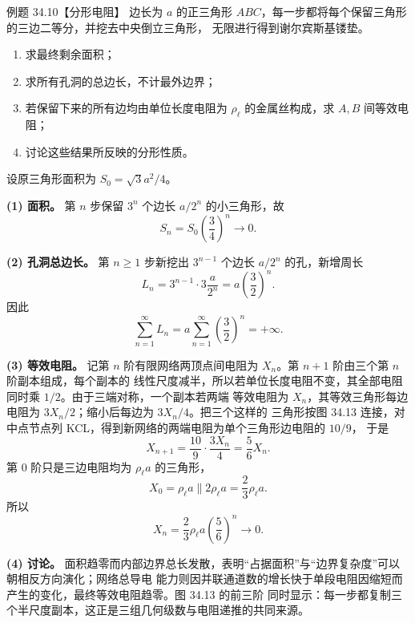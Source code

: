 \Needspace{0.48\textheight}
\begin{origexamplebox}{例题 34.10【分形电阻】}
边长为 $a$ 的正三角形 $ABC$，每一步都将每个保留三角形的三边二等分，并挖去中央倒立三角形，
无限进行得到谢尔宾斯基镂垫。
\begin{enumerate}[label=(\arabic*),leftmargin=2.2em]
  \item 求最终剩余面积；
  \item 求所有孔洞的总边长，不计最外边界；
  \item 若保留下来的所有边均由单位长度电阻为 $\rho_\ell$ 的金属丝构成，求 $A,B$ 间等效电阻；
  \item 讨论这些结果所反映的分形性质。
\end{enumerate}
\end{origexamplebox}

\begin{xesolution}
设原三角形面积为 $S_0=\sqrt3a^2/4$。

\textbf{(1) 面积。}
第 $n$ 步保留 $3^n$ 个边长 $a/2^n$ 的小三角形，故
\begin{equation}
  S_n=S_0\left(\frac34\right)^n
  \longrightarrow\boxed{0}.
\end{equation}

\textbf{(2) 孔洞总边长。}
第 $n\ge1$ 步新挖出 $3^{n-1}$ 个边长 $a/2^n$ 的孔，新增周长
\[
  L_n=3^{n-1}\cdot3\frac{a}{2^n}=a\left(\frac32\right)^n.
\]
因此
\begin{equation}
  \sum_{n=1}^{\infty}L_n
  =a\sum_{n=1}^{\infty}\left(\frac32\right)^n
  =\boxed{+\infty}.
\end{equation}

\textbf{(3) 等效电阻。}
记第 $n$ 阶有限网络两顶点间电阻为 $X_n$。第 $n+1$ 阶由三个第 $n$ 阶副本组成，每个副本的
线性尺度减半，所以若单位长度电阻不变，其全部电阻同时乘 $1/2$。由于三端对称，一个副本若两端
等效电阻为 $X_n$，其等效三角形每边电阻为 $3X_n/2$；缩小后每边为 $3X_n/4$。把三个这样的
三角形按图 34.13 连接，对中点节点列 KCL，得到新网络的两端电阻为单个三角形边电阻的 $10/9$，
于是
\begin{equation}
  X_{n+1}=\frac{10}{9}\cdot\frac{3X_n}{4}=\frac56X_n.
\end{equation}
第 0 阶只是三边电阻均为 $\rho_\ell a$ 的三角形，
\[
  X_0=\rho_\ell a\parallel2\rho_\ell a=\frac23\rho_\ell a.
\]
所以
\begin{equation}
  X_n=\frac23\rho_\ell a\left(\frac56\right)^n
  \longrightarrow\boxed{0}.
\end{equation}

\textbf{(4) 讨论。}
面积趋零而内部边界总长发散，表明“占据面积”与“边界复杂度”可以朝相反方向演化；网络总导电
能力则因并联通道数的增长快于单段电阻因缩短而产生的变化，最终等效电阻趋零。图 34.13 的前三阶
同时显示：每一步都复制三个半尺度副本，这正是三组几何级数与电阻递推的共同来源。

\sierpinskiDiagram
\end{xesolution}

